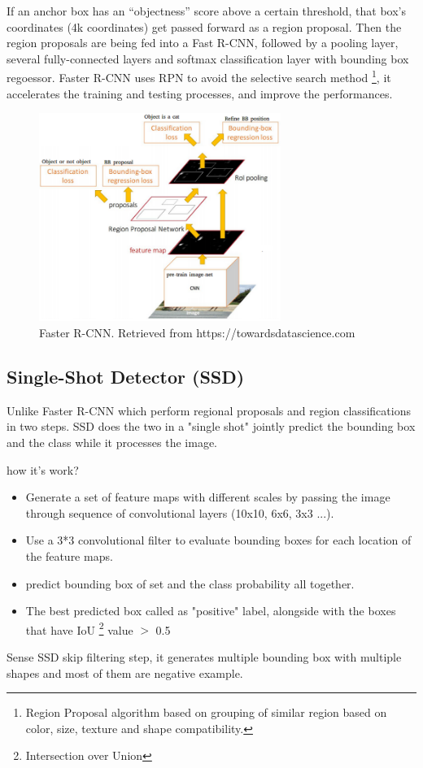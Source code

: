 \documentclass[12pt]{report}
\begin{document}
If an anchor box has an “objectness” score above a certain threshold, that box’s coordinates (4k coordinates) get passed forward as a region proposal.
Then the region proposals are being fed into a Fast R-CNN, followed by a pooling layer, several fully-connected layers
and softmax classification layer with bounding box regoessor.
Faster R-CNN uses RPN to avoid the 
selective search method \footnote{ Region Proposal algorithm based on grouping of similar region based on color, size, texture and shape compatibility.}, 
it accelerates the training and testing 
processes, and improve the performances. \cite{Ren2017a}
\begin{figure}[h]
    \centering
    \includegraphics[width=0.7\textwidth]{./images/frcnn.png}
    \caption{Faster R-CNN. Retrieved from https://towardsdatascience.com}
    \label{fig:frcnn}
\end{figure} 

\subsection{Single-Shot Detector (SSD)}

Unlike Faster R-CNN which perform regional proposals 
and region classifications in two steps. SSD does the two in a "single shot"
jointly predict the bounding box and the class while it processes the image.

how it's work?
\begin{itemize}
    \item Generate a set of feature maps with different scales 
    by passing the image through sequence of convolutional layers (10x10, 6x6, 3x3 ...).
    \item Use a 3*3 convolutional filter to evaluate bounding boxes for each location of the feature maps.
    \item predict bounding box of set and the class probability all together.
    \item The best predicted box called as "positive" label, alongside with
    the boxes that have IoU \footnote{Intersection over Union } value $>$ 0.5 
\end{itemize}
Sense SSD skip filtering step, it generates multiple bounding box with multiple shapes
and most of them are negative example.
\end{document}
